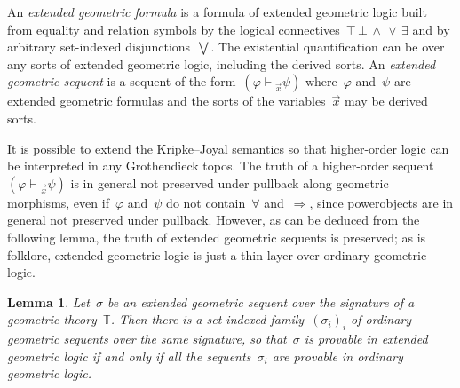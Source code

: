 \documentclass[oneside,reqno]{amsart}
\theoremstyle{definition}
\theoremstyle{plain}
\newtheorem{lemma}[defn]{Lemma}
\theoremstyle{remark}
\newcommand{\TT}{\mathbb{T}}
\renewcommand{\_}{\mathpunct{.}\,}
\newcommand{\?}{\,{:}\,}
\newcommand{\seq}[1]{\mathrel{\vdash\!\!\!_{#1}}}
\begin{document}
An \emph{extended geometric formula} is a formula of extended geometric logic built from equality and
relation symbols by the logical
connectives~${\top}\,{\bot}\,{\wedge}\,{\vee}\,{\exists}$
and by arbitrary set-indexed disjunctions~$\bigvee$. The existential
quantification can be over any sorts of extended geometric logic, including the derived sorts. An
\emph{extended geometric sequent} is a sequent of the form~$(\varphi
\seq{\vec x} \psi)$ where~$\varphi$ and~$\psi$ are extended geometric
formulas and the sorts of the variables~$\vec x$ may be derived sorts.

It is possible to extend the Kripke--Joyal semantics so that higher-order logic
can be interpreted in any Grothendieck topos. The truth of a higher-order
sequent~$(\varphi \seq{\vec x} \psi)$ is in general not preserved under
pullback along geometric morphisms, even if~$\varphi$ and~$\psi$ do not
contain~${\forall}$ and~$\Rightarrow$, since powerobjects are in general not
preserved under pullback. However, as can be deduced from the following lemma,
the truth of extended geometric sequents is preserved; as is folklore, extended
geometric logic is just a thin layer over ordinary geometric logic.

\begin{lemma}\label{lemma:extended-conservative}
Let~$\sigma$ be an extended geometric sequent over the signature
of a geometric theory~$\TT$. Then there is a set-indexed family~$(\sigma_i)_i$ of ordinary
geometric sequents over the same signature, so that~$\sigma$ is provable in
extended geometric logic if and only if all the sequents~$\sigma_i$ are
provable in ordinary geometric logic.\end{lemma}
\end{document}
